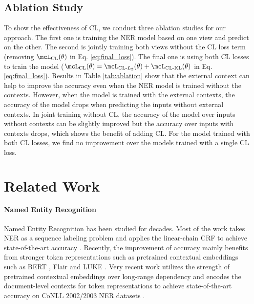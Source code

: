\subsection{Ablation Study}
To show the effectiveness of CL, we conduct three ablation studies for our approach. The first one is training the NER model based on one view and predict on the other. The second is jointly training both views without the CL loss term (removing $\mcL_{\text{CL}}(\theta)$ in Eq. \ref{eq:final_loss}). The final one is using both CL losses to train the model ($\mcL_{\text{CL}}(\theta)=\mcL_{\text{CL-$L_2$}}(\theta)+\mcL_{\text{CL-KL}}(\theta)$ in Eq. \ref{eq:final_loss}). Results in Table \ref{tab:ablation} show that the external context can help to improve the accuracy even when the NER model is trained without the contexts. However, when the model is trained with the external contexts, the accuracy of the model drops when predicting the inputs without external contexts. In joint training without CL, the accuracy of the model over inputs without contexts can be slightly improved but the accuracy over inputs with contexts drops, which shows the benefit of adding CL. For the model trained with both CL losses, we find no improvement over the models trained with a single CL loss. %

\section{Related Work}
\paragraph{Named Entity Recognition}
Named Entity Recognition \citep{Sundheim1995NamedET} has been studied for decades. Most of the work takes NER as a sequence labeling problem and applies the linear-chain CRF \citep{10.5555/645530.655813} to achieve state-of-the-art accuracy \citep{ma-hovy-2016-end,lample-etal-2016-neural,akbik-etal-2018-contextual,akbik-etal-2019-pooled,wang-etal-2020-more}. 
Recently, the improvement of accuracy mainly benefits from stronger token representations such as pretrained contextual embeddings such as BERT \citep{devlin-etal-2019-bert}, Flair \citep{akbik-etal-2018-contextual} and LUKE \citep{yamada-etal-2020-luke}. Very recent work \citep{yu-etal-2020-named,yamada-etal-2020-luke} utilizes the strength of pretrained contextual embeddings over long-range dependency and encodes the document-level contexts for token representations to achieve state-of-the-art accuracy on CoNLL 2002/2003 NER datasets \citep{tjong-kim-sang-2002-introduction,tjong-kim-sang-de-meulder-2003-introduction}. 

